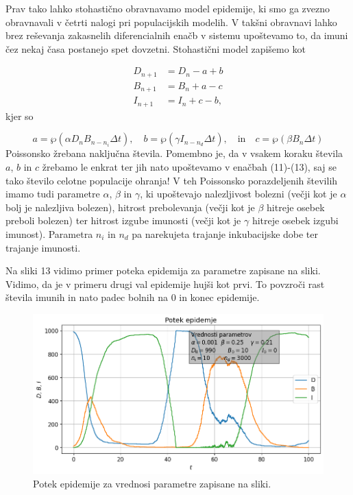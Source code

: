 \documentclass[slovene,11pt,a4paper]{article}
\begin{document}
Prav tako lahko stohastično obravnavamo model epidemije, ki smo ga zvezno obravnavali v četrti nalogi pri populacijskih modelih. V takšni obravnavi lahko brez reševanja zakasnelih diferencialnih enačb v sistemu upoštevamo to, da imuni čez nekaj časa postanejo spet dovzetni. Stohastični model zapišemo kot

\begin{align}
D_{n+1} &= D_n - a + b \\
B_{n+1} &= B_n + a - c \\
I_{n+1} &= I_n + c - b,
\end{align}
kjer so

\[
a = \wp (\alpha D_n B_{n-n_i} \Delta t), \quad
b = \wp (\gamma I_{n-n_d} \Delta t), \quad \text{in} \quad
c = \wp (\beta B_n \Delta t)
\]
Poissonsko žrebana naključna števila. Pomembno je, da v vsakem koraku števila $a$, $b$ in $c$ žrebamo le enkrat ter jih nato upoštevamo v enačbah (11)-(13), saj se tako število celotne populacije ohranja! V teh Poissonsko porazdeljenih številih imamo tudi parametre $\alpha$, $\beta$ in $\gamma$, ki upoštevajo nalezljivost bolezni (večji kot je $\alpha$ bolj je nalezljiva bolezen), hitrost prebolevanja (večji kot je $\beta$ hitreje osebek preboli bolezen) ter hitrost izgube imunosti (večji kot je $\gamma$ hitreje osebek izgubi imunost). Parametra $n_i$ in $n_d$ pa narekujeta trajanje inkubacijske dobe ter trajanje imunosti.

Na sliki 13 vidimo primer poteka epidemija za parametre zapisane na sliki. Vidimo, da je v primeru drugi val epidemije hujši kot prvi. To povzroči rast števila imunih in nato padec bolnih na $0$ in konec epidemije.

\begin{figure}[h!]
\centering
\includegraphics[width=16cm]{slika13.png}
\caption{Potek epidemije za vrednosi parametre zapisane na sliki.}
\end{figure}
\end{document}
